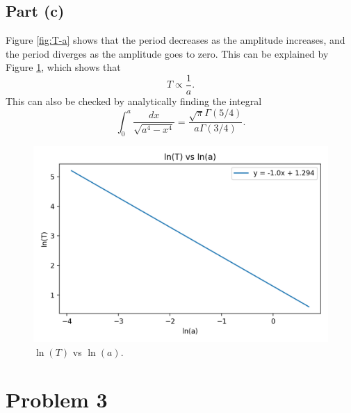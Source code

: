 \documentclass[11pt]{article}
\begin{document}
\subsection{Part (c)}
Figure \ref{fig:T-a} shows that the period decreases as the amplitude increases, and the period diverges as the amplitude goes to zero. This can be explained by Figure \ref{fig:lnT-lna}, which shows that
\begin{equation}
    T \propto \frac{1}{a}.
\end{equation}
This can also be checked by analytically finding the integral
\begin{equation}
    \int_0^a \frac{dx}{\sqrt{a^4 - x^4}} =  \frac{\sqrt{\pi} \Gamma (5/4)}{a \Gamma (3/4)}.
\end{equation}
\begin{figure}[H]
    \centering
    \includegraphics[scale = 1.0]{images/ps-4-2c.png}
    \caption{$\ln{(T)}$ vs $\ln{(a)}$.}
    \label{fig:lnT-lna}
\end{figure}

\section{Problem 3}
\end{document}
